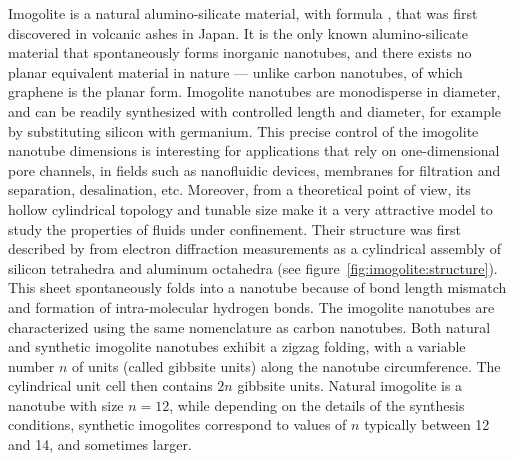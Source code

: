 \documentclass[thesis]{subfiles}
\begin{document}
Imogolite is a natural alumino-silicate material, with formula
, that was first discovered in volcanic ashes in
Japan\cite{Yoshinaga1962}. It is the only known alumino-silicate material that
spontaneously forms inorganic nanotubes, and there exists no planar equivalent
material in nature --- unlike carbon nanotubes, of which graphene is the planar
form. Imogolite nanotubes are monodisperse in diameter, and can be readily
synthesized with controlled length and diameter, for example by substituting
silicon with germanium\cite{Amara2013}. This precise control of the imogolite
nanotube dimensions is interesting for applications that rely on one-dimensional
pore channels, in fields such as nanofluidic devices, membranes for filtration
and separation, desalination, etc. Moreover, from a theoretical point of view,
its hollow cylindrical topology and tunable size make it a very attractive
model to study the properties of fluids under confinement. Their structure was
first described by \citeauthor{Cradwick1972}\cite{Cradwick1972} from electron
diffraction measurements as a cylindrical assembly of silicon tetrahedra and
aluminum octahedra (see figure~\ref{fig:imogolite:structure}). This sheet
spontaneously folds into a nanotube because of bond length mismatch and
formation of intra-molecular hydrogen bonds\cite{Lee2011,Gonzalez2014}. The
imogolite nanotubes are characterized using the same nomenclature as carbon
nanotubes. Both natural and synthetic imogolite nanotubes exhibit a zigzag
folding, with a variable number $n$ of  units (called
gibbsite units) along the nanotube circumference. The cylindrical unit cell then
contains $2n$ gibbsite units. Natural imogolite is a nanotube with size $n=12$,
while depending on the details of the synthesis conditions, synthetic imogolites
correspond to values of $n$ typically between 12 and 14, and sometimes larger.
\end{document}
